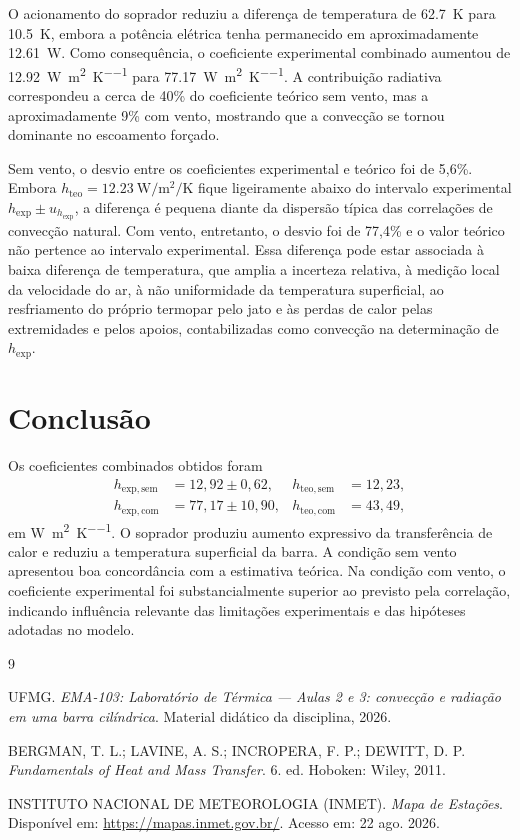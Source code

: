 \documentclass[11pt,a4paper]{article}
\newcommand{\hexpsem}{12{,}92}
\newcommand{\hexpcom}{77{,}17}
\newcommand{\uhexpsem}{0{,}62}
\newcommand{\uhexpcom}{10{,}90}
\newcommand{\hteosem}{12{,}23}
\newcommand{\hteocom}{43{,}49}
\begin{document}
O acionamento do soprador reduziu a diferença de temperatura de \SI{62.7}{\kelvin} para \SI{10.5}{\kelvin}, embora a potência elétrica tenha permanecido em aproximadamente \SI{12.61}{\watt}. Como consequência, o coeficiente experimental combinado aumentou de \SI{12.92}{\watt\per\square\metre\per\kelvin} para \SI{77.17}{\watt\per\square\metre\per\kelvin}. A contribuição radiativa correspondeu a cerca de 40\% do coeficiente teórico sem vento, mas a aproximadamente 9\% com vento, mostrando que a convecção se tornou dominante no escoamento forçado.

Sem vento, o desvio entre os coeficientes experimental e teórico foi de 5,6\%. Embora $h_{\mathrm{teo}}=\SI{12.23}{\watt\per\square\metre\per\kelvin}$ fique ligeiramente abaixo do intervalo experimental $h_{\mathrm{exp}}\pm u_{h_{\mathrm{exp}}}$, a diferença é pequena diante da dispersão típica das correlações de convecção natural. Com vento, entretanto, o desvio foi de 77,4\% e o valor teórico não pertence ao intervalo experimental. Essa diferença pode estar associada à baixa diferença de temperatura, que amplia a incerteza relativa, à medição local da velocidade do ar, à não uniformidade da temperatura superficial, ao resfriamento do próprio termopar pelo jato e às perdas de calor pelas extremidades e pelos apoios, contabilizadas como convecção na determinação de $h_{\mathrm{exp}}$.

\section{Conclusão}

Os coeficientes combinados obtidos foram
\begin{align*}
  h_{\mathrm{exp,sem}} &= \hexpsem\pm\uhexpsem,
  & h_{\mathrm{teo,sem}} &= \hteosem,\\
  h_{\mathrm{exp,com}} &= \hexpcom\pm\uhexpcom,
  & h_{\mathrm{teo,com}} &= \hteocom,
\end{align*}
em \si{\watt\per\square\metre\per\kelvin}. O soprador produziu aumento expressivo da transferência de calor e reduziu a temperatura superficial da barra. A condição sem vento apresentou boa concordância com a estimativa teórica. Na condição com vento, o coeficiente experimental foi substancialmente superior ao previsto pela correlação, indicando influência relevante das limitações experimentais e das hipóteses adotadas no modelo.

\begin{thebibliography}{9}

UFMG. \textit{EMA-103: Laboratório de Térmica --- Aulas 2 e 3: convecção e radiação em uma barra cilíndrica}. Material didático da disciplina, 2026.

BERGMAN, T. L.; LAVINE, A. S.; INCROPERA, F. P.; DEWITT, D. P. \textit{Fundamentals of Heat and Mass Transfer}. 6. ed. Hoboken: Wiley, 2011.

INSTITUTO NACIONAL DE METEOROLOGIA (INMET). \textit{Mapa de Estações}. Disponível em: \url{https://mapas.inmet.gov.br/}. Acesso em: 22 ago. 2026.

\end{thebibliography}
\end{document}
